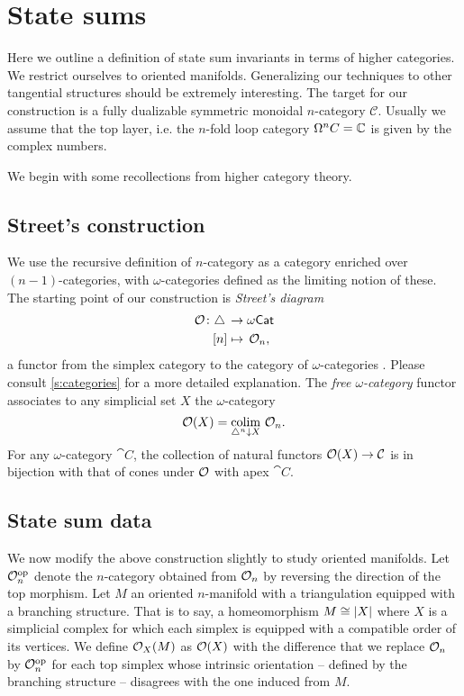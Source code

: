 
\section{State sums}

Here we outline a definition of state sum invariants in terms of higher categories.
We restrict ourselves to oriented manifolds.
Generalizing our techniques to other tangential structures should be extremely interesting.
The target for our construction is a fully dualizable symmetric monoidal $n$-category $\mathcal{C}$.
Usually we assume that the top layer, i.e.
the $n$-fold loop category $\Omega^nC = \mathbb{C} $ is given by the complex numbers.

We begin with some recollections from higher category theory.

\subsection{Street's construction}

We use the recursive definition of $n$-category as a category enriched over $(n-1)$-categories, with $\omega$-categories defined as the limiting notion of these.
The starting point of our construction is \textit{Street's diagram}
\[
\begin{split}
	\mathcal{O} \colon \triangle \, &\to \omega\mathsf{Cat} \\
	[n] &\mapsto \, \mathcal{O}_n,
\end{split}
\]
a functor from the simplex category to the category of $\omega$-categories \cite{street1987orientals}.
Please consult \cref{s:categories} for a more detailed explanation.
The \textit{free $\omega$-category} functor associates to any simplicial set $X$ the $\omega$-category
\[
\mathcal{O}(X) = \operatorname*{colim}_{\triangle^n \downarrow X} \, \mathcal{O}_n.
\]
For any $\omega$-category $\cat{C}$, the collection of natural functors $\mathcal{O}(X) \to \mathcal{C}$ is in bijection with that of cones under $\mathcal{O}$ with apex $\cat{C}$.

\subsection{State sum data}

We now modify the above construction slightly to study oriented manifolds.
Let $\mathcal{O}_n^{\mathrm{op}}$ denote the $n$-category obtained from $\mathcal{O}_n$ by reversing the direction of the top morphism.
Let $M$ an oriented $n$-manifold with a triangulation equipped with a branching structure.
That is to say, a homeomorphism $M \cong \lvert X\rvert$ where $X$ is a simplicial complex for which each simplex is equipped with a compatible order of its vertices.
We define $\mathcal{O}_X(M)$ as $\mathcal{O}(X)$ with the difference that we replace $\mathcal{O}_n$ by $\mathcal{O}_n^{\mathrm{op}}$ for each top simplex whose intrinsic orientation -- defined by the branching structure -- disagrees with the one induced from $M$.

